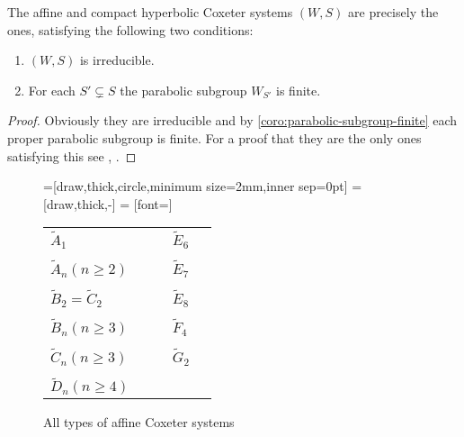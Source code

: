 \begin{lemm}
	The affine and compact hyperbolic Coxeter systems $(W,S)$ are precisely the ones, satisfying the following two conditions:
	\begin{enumerate}
		\item $(W,S)$ is irreducible.
		\item For each $S' \subsetneq S$ the parabolic subgroup $W_{S'}$ is finite.
	\end{enumerate}

	\begin{proof}
		Obviously they are irreducible and by \ref{coro:parabolic-subgroup-finite} each proper parabolic subgroup is finite. For a proof that they are the only ones satisfying this see \cite{humphreys:coxeter}, \cite{chein:hyerbolic}.
	\end{proof}
\end{lemm}

\begin{figure}
	\centering
	=[draw,thick,circle,minimum size=2mm,inner sep=0pt]
	 = [draw,thick,-]
	 = [font=\small]

	\begin{tabular}{MMcMM}
	$\tilde A_1$
	&
	\tildeAone
	&
	\hspace*{\cgpadh}
	&
	$\tilde E_6$
	&
	\tildeEsix
	\\
	\vspace*{\cgpadv}
	\\
	$\tilde A_n (n \geq 2)$
	&
	\tildeAn
	&
	\hspace*{\cgpadh}
	&
	$\tilde E_7$
	&
	\tildeEseven
	\\
	\vspace*{\cgpadv}
	\\
	$\tilde B_2 = \tilde C_2$
	&
	\tildeBCtwo
	&
	\hspace*{\cgpadh}
	&
	$\tilde E_8$
	&
	\tildeEeight
	\\
	\vspace*{\cgpadv}
	\\
	$\tilde B_n (n \geq 3)$
	&
	\tildeBn
	&
	\hspace*{\cgpadh}
	&
	$\tilde F_4$
	&
	\tildeFfour
	\\
	\vspace*{\cgpadv}
	\\
	$\tilde C_n (n \geq 3)$
	&
	\tildeCn
	&
	\hspace*{\cgpadh}
	&
	$\tilde G_2$
	&
	\tildeGtwo
	\\
	\vspace*{\cgpadv}
	\\
	$\tilde D_n (n \geq 4)$
	&
	\tildeDn
	\end{tabular}
	\caption{All types of affine Coxeter systems}
	\label{fig:affine-coxeter-systems}
\end{figure}

